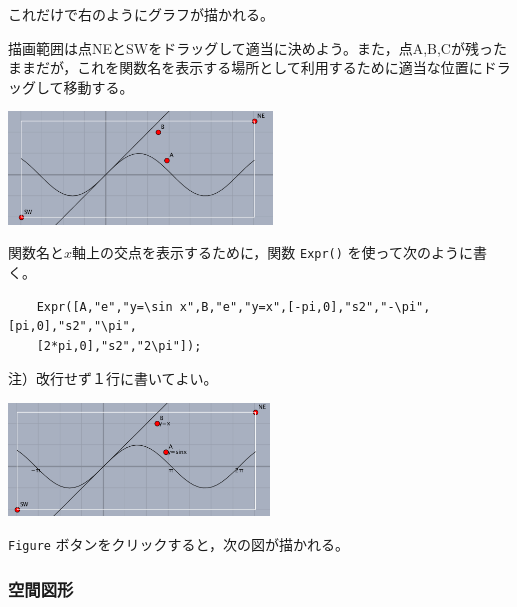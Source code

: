 \documentclass[papersize,a4paper,12pt,uplatex]{jsarticle}
\begin{document}
これだけで右のようにグラフが描かれる。

\vspace{15mm}

描画範囲は点NEとSWをドラッグして適当に決めよう。また，点A,B,Cが残ったままだが，これを関数名を表示する場所として利用するために適当な位置にドラッグして移動する。

\begin{center}\includegraphics[bb=0.00 0.00 556.03 238.01,height=30mm]{Fig/xsinx02.pdf} \end{center}

関数名と$x$軸上の交点を表示するために，関数 \verb|Expr()| を使って次のように書く。
\begin{verbatim}
    Expr([A,"e","y=\sin x",B,"e","y=x",[-pi,0],"s2","-\pi",[pi,0],"s2","\pi",
    [2*pi,0],"s2","2\pi"]);
\end{verbatim}

注）改行せず１行に書いてよい。

\begin{center}\includegraphics[bb=0.00 0.00 546.03 236.01,height=30mm]{Fig/xsinx03.pdf} \end{center}

\verb|Figure| ボタンをクリックすると，次の図が描かれる。

\vspace{\baselineskip}
\begin{center} \end{center}


\subsubsection{空間図形}
\end{document}

